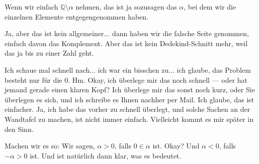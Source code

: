 \begin{student-interaction}
Wenn wir einfach $\mathbb{Q} \setminus \alpha$ nehmen, das ist ja sozusagen das $\alpha$, bei dem wir die einzelnen Elemente entgegengenommen haben.
\end{student-interaction}

\begin{spoken-clean}[01:05:30 - 01:07:15]
Ja, aber das ist kein allgemeiner... dann haben wir die falsche Seite genommen, einfach davon das Komplement. Aber das ist kein Dedekind-Schnitt mehr, weil das ja bis zu einer Zahl geht.

Ich schaue mal schnell nach... ich war ein bisschen zu... ich glaube, das Problem besteht nur für die $0$. Hm. Okay, ich überlege mir das noch schnell --- oder hat jemand gerade einen klaren Kopf? Ich überlege mir das sonst noch kurz, oder Sie überlegen es sich, und ich schreibe es Ihnen nachher per Mail. Ich glaube, das ist einfacher. Ja, ich habe das vorher zu schnell überlegt, und solche Sachen an der Wandtafel zu machen, ist nicht immer einfach. Vielleicht kommt es mir später in den Sinn.

Machen wir es so: Wir sagen, $\alpha > 0$, falls $0 \in \alpha$ ist. Okay? Und $\alpha < 0$, falls $-\alpha > 0$ ist. Und  ist natürlich dann klar, was es bedeutet.
\end{spoken-clean}

\begin{math-stroke}

\end{math-stroke}

